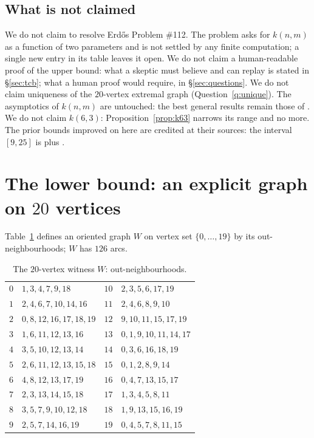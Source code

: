 \documentclass[11pt]{amsart}
\theoremstyle{plain}
\theoremstyle{definition}
\theoremstyle{remark}
\begin{document}
\subsection{What is not claimed}\label{ssec:notclaimed}
We do not claim to resolve Erd\H{o}s Problem \#112. The problem asks for
$k(n,m)$ as a function of two parameters and is not settled by any
finite computation; a single new entry in its table leaves it open. We
do not claim a human-readable proof of the upper bound: what a
skeptic must believe and can replay is stated in \S\ref{sec:tcb}; what
a human proof would require, in
\S\ref{sec:questions}. We do not claim uniqueness of the $20$-vertex
extremal graph (Question~\ref{q:unique}). The asymptotics of $k(n,m)$
are untouched: the best general results remain those of
\cite{ErRa67,LaMi97,IRW21}. We do not claim
$k(6,3)$: Proposition~\ref{prop:k63} narrows its range and no more. The
prior bounds improved on here are credited at their sources: the
interval $[9,25]$ is \cite{Ber74} plus \cite{IRW21}.

\section{The lower bound: an explicit graph on $20$
vertices}\label{sec:witness}

Table~\ref{tab:witness} defines an oriented graph $W$ on vertex set
$\{0,\dots,19\}$ by its out-neighbourhoods; $W$ has $126$ arcs.

\begin{table}[ht]
\begin{center}
\small
\begin{tabular}{r@{\ $\to$\ }l@{\qquad}r@{\ $\to$\ }l}
\toprule
$0$ & $1,3,4,7,9,18$        & $10$ & $2,3,5,6,17,19$ \\
$1$ & $2,4,6,7,10,14,16$    & $11$ & $2,4,6,8,9,10$ \\
$2$ & $0,8,12,16,17,18,19$  & $12$ & $9,10,11,15,17,19$ \\
$3$ & $1,6,11,12,13,16$     & $13$ & $0,1,9,10,11,14,17$ \\
$4$ & $3,5,10,12,13,14$     & $14$ & $0,3,6,16,18,19$ \\
$5$ & $2,6,11,12,13,15,18$  & $15$ & $0,1,2,8,9,14$ \\
$6$ & $4,8,12,13,17,19$     & $16$ & $0,4,7,13,15,17$ \\
$7$ & $2,3,13,14,15,18$     & $17$ & $1,3,4,5,8,11$ \\
$8$ & $3,5,7,9,10,12,18$    & $18$ & $1,9,13,15,16,19$ \\
$9$ & $2,5,7,14,16,19$      & $19$ & $0,4,5,7,8,11,15$ \\
\bottomrule
\end{tabular}
\end{center}
\caption{The $20$-vertex witness $W$: out-neighbourhoods.}
\label{tab:witness}
\end{table}
\end{document}
